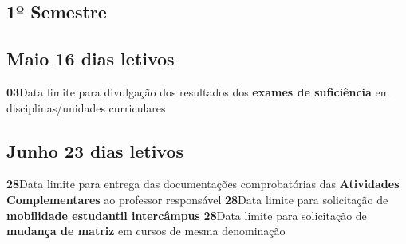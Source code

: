\documentclass[thesis]{hmcposter}
\begin{document}
\begin{poster}
\section{\hfill \color{hmcorange}1º Semestre}
\subsection{Maio \hfill 16 dias letivos}\textbf{03}\qquad Data limite para divulgação dos resultados dos \textbf{exames de suficiência} em disciplinas/unidades curriculares \newline \null\subsection{Junho \hfill 23 dias letivos}\textbf{28}\qquad Data limite para entrega das documentações comprobatórias das \textbf{Atividades Complementares} ao professor responsável \newline \null\textbf{28}\qquad Data limite para solicitação de \textbf{mobilidade estudantil intercâmpus} \newline \null\textbf{28}\qquad Data limite para solicitação de \textbf{mudança de matriz} em cursos de mesma denominação \newline \null\newpage

\end{poster}
\end{document}

